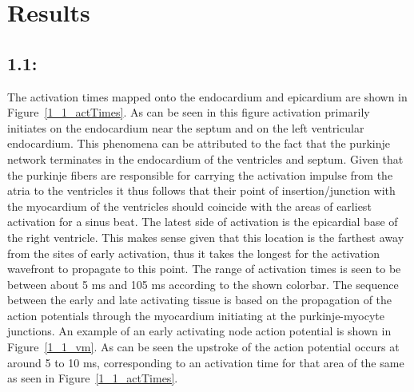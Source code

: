 \documentclass[12pt]{article}
\begin{document}
 
\section{Results}
\subsection{1.1: }
The activation times mapped onto the endocardium and epicardium are shown in Figure~\ref{1_1_actTimes}. As can be seen in this figure activation primarily initiates on the endocardium near the septum and on the left ventricular endocardium. This phenomena can be attributed to the fact that the purkinje network terminates in the endocardium of the ventricles and septum. Given that the purkinje fibers are responsible for carrying the activation impulse from the atria to the ventricles it thus follows that their point of insertion/junction with the myocardium of the ventricles should coincide with the areas of earliest activation for a sinus beat. The latest side of activation is the epicardial base of the right ventricle. This makes sense given that this location is the farthest away from the sites of early activation, thus it takes the longest for the activation wavefront to propagate to this point. The range of activation times is seen to be between about 5 ms and 105 ms according to the shown colorbar. The sequence between the early and late activating tissue is based on the propagation of the action potentials through the myocardium initiating at the purkinje-myocyte junctions. An example of an early activating node action potential is shown in Figure~\ref{1_1_vm}. As can be seen the upstroke of the action potential occurs at around 5 to 10 ms, corresponding to an activation time for that area of the same as seen in Figure~\ref{1_1_actTimes}. 
\end{document}
